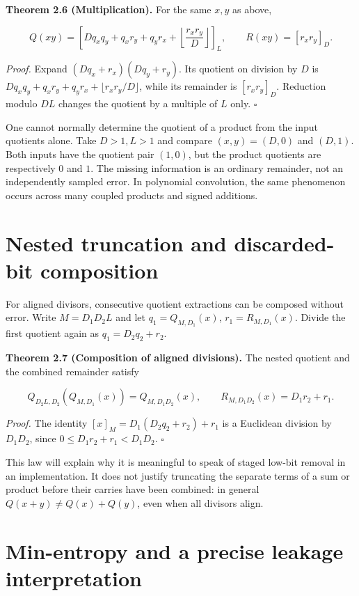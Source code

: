 \documentclass[
  11pt,
  a4paper,
  oneside]{report}
\begin{document}
\textbf{Theorem 2.6 (Multiplication).} For the same \(x,y\) as above,

\[
Q(xy)=\left[
Dq_xq_y+q_xr_y+q_yr_x+
\left\lfloor\frac{r_xr_y}{D}\right\rfloor
\right]_L,
\qquad R(xy)=[r_xr_y]_D.
\]

\emph{Proof.} Expand \((Dq_x+r_x)(Dq_y+r_y)\). Its quotient on division
by \(D\) is \(Dq_xq_y+q_xr_y+q_yr_x+\lfloor r_xr_y/D\rfloor\), while its
remainder is \([r_xr_y]_D\). Reduction modulo \(DL\) changes the
quotient by a multiple of \(L\) only. \(\square\)

One cannot normally determine the quotient of a product from the input
quotients alone. Take \(D>1,L>1\) and compare \((x,y)=(D,0)\) and
\((D,1)\). Both inputs have the quotient pair \((1,0)\), but the product
quotients are respectively \(0\) and \(1\). The missing information is
an ordinary remainder, not an independently sampled error. In polynomial
convolution, the same phenomenon occurs across many coupled products and
signed additions.

\section{Nested truncation and discarded-bit
composition}\label{nested-truncation-and-discarded-bit-composition}

For aligned divisors, consecutive quotient extractions can be composed
without error. Write \(M=D_1D_2L\) and let \(q_1=Q_{M,D_1}(x)\),
\(r_1=R_{M,D_1}(x)\). Divide the first quotient again as
\(q_1=D_2q_2+r_2\).

\textbf{Theorem 2.7 (Composition of aligned divisions).} The nested
quotient and the combined remainder satisfy

\[
Q_{D_2L,D_2}(Q_{M,D_1}(x))=Q_{M,D_1D_2}(x),
\qquad R_{M,D_1D_2}(x)=D_1r_2+r_1.
\]

\emph{Proof.} The identity \([x]_M=D_1(D_2q_2+r_2)+r_1\) is a Euclidean
division by \(D_1D_2\), since \(0\le D_1r_2+r_1<D_1D_2\). \(\square\)

This law will explain why it is meaningful to speak of staged low-bit
removal in an implementation. It does not justify truncating the
separate terms of a sum or product before their carries have been
combined: in general \(Q(x+y)\ne Q(x)+Q(y)\), even when all divisors
align.

\section{Min-entropy and a precise leakage
interpretation}\label{min-entropy-and-a-precise-leakage-interpretation}
\end{document}

